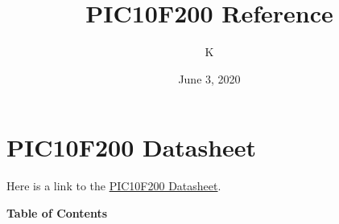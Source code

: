 \documentclass[12pt, letterpaper]{article}
\title{PIC10F200 Reference}
\author{K}
\date{June 3, 2020}
\begin{document}

\maketitle

\tableofcontents{}
\pagebreak

\section{PIC10F200 Datasheet}
Here is a link to the \href{https://ww1.microchip.com/downloads/en/DeviceDoc/40001239F.pdf}{PIC10F200 Datasheet}.

\noindent \textbf{Table of Contents}
\end{document}
